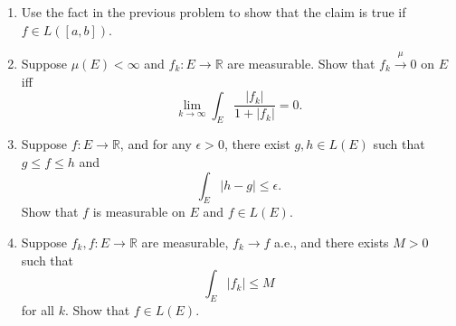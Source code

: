 \documentclass{article}
\newcommand{\mto}{\stackrel{\mu}{\rightarrow}}
\begin{document}
\begin{enumerate}




\item Use the fact in the previous problem to show that the claim is true if $f \in L([a,b])$.





\item Suppose $\mu(E) < \infty$ and $f_{k}: E \to \mathbb{R}$ are measurable. Show that $f_{k} \mto 0$ on $E$ iff
\[
\lim_{k\to \infty }\int_{E} \frac{|f_{k}|}{1+|f_{k}|} = 0.
\]





\item Suppose $f: E \to \mathbb{R}$, and for any $\epsilon > 0$, there exist $g,h \in L(E)$ such that $g \le f \le h$ and
\[
\int_{E} |h - g |\le \epsilon.
\]
Show that $f$ is measurable on $E$ and $f \in L(E)$.







\item Suppose $f_{k},f: E \to \mathbb{R}$ are measurable, $f_{k} \to f$ a.e., and there exists $M>0$ such that
\[
\int_{E} |f_{k}| \le M
\]
for all $k$. Show that $f \in L(E)$.







\end{enumerate}
\end{document}
